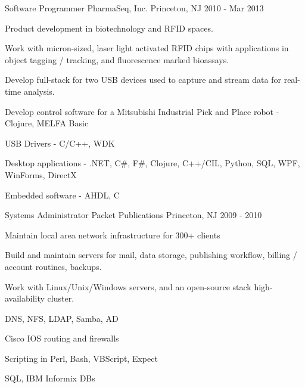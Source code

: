 \documentclass[11pt, letterpaper]{awesome-cv}
\begin{document}
\begin{cventries}
{\begin{cvitems}
      \end{cvitems}
    }
  \vspace{1mm}
  \cventry
    {Software Programmer} %
    {PharmaSeq, Inc.} %
    {Princeton, NJ} %
    {2010 - Mar 2013} %
    {
      \begin{cvitems} 
        \item {Product development in biotechnology and RFID spaces.}
        \item {Work with micron-sized, laser light activated RFID chips with applications in object tagging / tracking, and fluorescence marked bioassays.}
        \item {Develop full-stack for two USB devices used to capture and stream data for real-time analysis.}
        \item {Develop control software for a Mitsubishi Industrial Pick and Place robot - Clojure, MELFA Basic}
        \item {USB Drivers - C/C++, WDK}
        \item {Desktop applications - .NET, C\#, F\#, Clojure, C++/CIL, Python, SQL, WPF, WinForms, DirectX}
        \item {Embedded software - AHDL, C}
      \end{cvitems}
    }

  \cventry
    {Systems Administrator} %
    {Packet Publications} %
    {Princeton, NJ} %
    {2009 - 2010} %
    {
      \begin{cvitems} %
        \item {Maintain local area network infrastructure for 300+ clients}
        \item {Build and maintain servers for mail, data storage, publishing workflow, billing / account routines, backups.}
        \item {Work with Linux/Unix/Windows servers, and an open-source stack high-availability cluster.}
        \item {DNS, NFS, LDAP, Samba, AD}
        \item {Cisco IOS routing and firewalls}
        \item {Scripting in Perl, Bash, VBScript, Expect}
        \item {SQL, IBM Informix DBs}
      \end{cvitems}
    }

\end{cventries}
\end{document}
